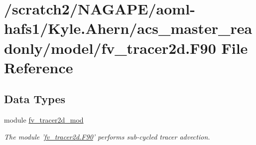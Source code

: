 \section{/scratch2/\-N\-A\-G\-A\-P\-E/aoml-\/hafs1/\-Kyle.Ahern/acs\-\_\-master\-\_\-readonly/model/fv\-\_\-tracer2d.F90 File Reference}
\label{fv__tracer2d_8F90}
\subsection*{Data Types}
\begin{DoxyCompactItemize}
\item 
module \hyperlink{classfv__tracer2d__mod}{fv\-\_\-tracer2d\-\_\-mod}
\begin{DoxyCompactList}\small\item\em The module '\hyperlink{fv__tracer2d_8F90}{fv\-\_\-tracer2d.\-F90}' performs sub-\/cycled tracer advection. \end{DoxyCompactList}\end{DoxyCompactItemize}
